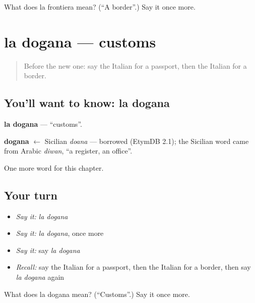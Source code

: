 \begin{tcolorbox}[breakable,colback=teal!4,colframe=teal!35!black,title={Before you move on}]
What does la frontiera mean? (\textquotedblleft{}A border\textquotedblright{}.) Say it once more.
\end{tcolorbox}
\section[la dogana]{la dogana — customs}

\label{lesson:IT-C192-dogana}



\begin{quote}
Before the new one: say the Italian for a passport, then the Italian for a border.
\end{quote}

\subsection*{You'll want to know: la dogana}
\textbf{la dogana} — \textquotedblleft{}customs\textquotedblright{}.

\begin{cousinweb}
\textbf{dogana} $\leftarrow$ Sicilian \emph{doana} — borrowed (EtymDB 2.1); the Sicilian word came from Arabic \emph{diwan}, \textquotedblleft{}a register, an office\textquotedblright{}.
\end{cousinweb}

\begin{grammarlens}[title={What you've built}]
One more word for this chapter.
\end{grammarlens}

\subsection*{Your turn}
\begin{itemize}
\raggedright
  \item \emph{Say it:} \emph{la dogana}
  \item \emph{Say it:} \emph{la dogana}, once more
  \item \emph{Say it:} say \emph{la dogana}
  \item \emph{Recall:} say the Italian for a passport, then the Italian for a border, then say \emph{la dogana} again
\end{itemize}

\begin{tcolorbox}[breakable,colback=teal!4,colframe=teal!35!black,title={Before you move on}]
What does la dogana mean? (\textquotedblleft{}Customs\textquotedblright{}.) Say it once more.
\end{tcolorbox}
